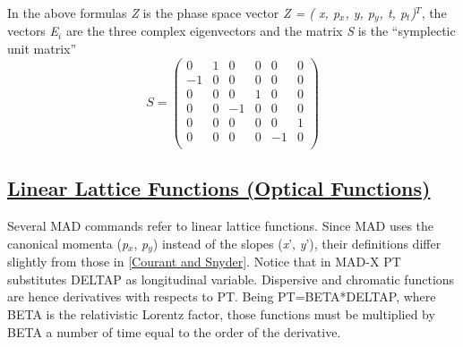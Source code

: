 In the above formulas \textit{Z} is the phase space vector
\textit{Z = ( x, p$_x$, y, p$_y$, t, p$_t$)$^T$}, the vectors
\textit{E$_i$} are the three complex eigenvectors and  
the matrix \textit{S} is the ``symplectic unit matrix'' 
\[
S =
 \begin{pmatrix}
  0 & 1 & 0 & 0 & 0 & 0 \\
  -1 & 0 & 0 & 0 & 0 & 0 \\
  0 & 0 & 0 & 1 & 0 & 0 \\
  0 & 0 & -1 & 0 & 0 & 0 \\
  0 & 0 & 0 & 0 & 0 & 1 \\
  0 & 0 & 0 & 0 & -1 & 0 \\
 \end{pmatrix}
\]


\subsection{\href{linear}{Linear Lattice Functions (Optical Functions)}} 

Several MAD commands refer to linear lattice functions. Since MAD uses
the canonical momenta (\textit{p$_x$}, \textit{p$_y$}) instead of the
slopes (\textit{x}', \textit{y}'), their definitions differ slightly
from those in \href{bibliography.html#courant}{[Courant and
    Snyder]}. Notice that in MAD-X PT substitutes DELTAP as longitudinal
variable. Dispersive and chromatic functions are hence derivatives with
respects to PT. Being PT=BETA*DELTAP, where BETA is the relativistic
Lorentz factor, those functions must be multiplied by BETA a number of
time equal to the order of the derivative. 

